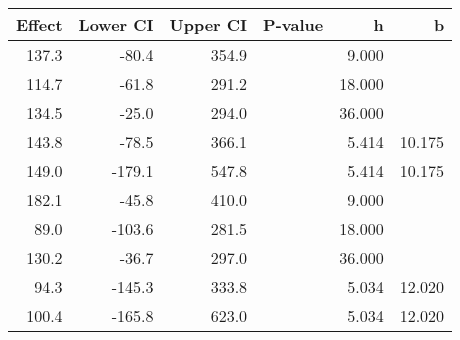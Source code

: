 \begin{table}[ht]
\centering
\begin{tabular}{rrrrrr}
  \hline
Effect & Lower CI & Upper CI & P-value & h & b \\ 
  \hline
137.3 & -80.4 & 354.9 &  & 9.000 &  \\ 
  114.7 & -61.8 & 291.2 &  & 18.000 &  \\ 
  134.5 & -25.0 & 294.0 &  & 36.000 &  \\ 
  143.8 & -78.5 & 366.1 &  & 5.414 & 10.175 \\ 
  149.0 & -179.1 & 547.8 &  & 5.414 & 10.175 \\ 
  182.1 & -45.8 & 410.0 &  & 9.000 &  \\ 
  89.0 & -103.6 & 281.5 &  & 18.000 &  \\ 
  130.2 & -36.7 & 297.0 &  & 36.000 &  \\ 
  94.3 & -145.3 & 333.8 &  & 5.034 & 12.020 \\ 
  100.4 & -165.8 & 623.0 &  & 5.034 & 12.020 \\ 
   \hline
\end{tabular}
\end{table}
